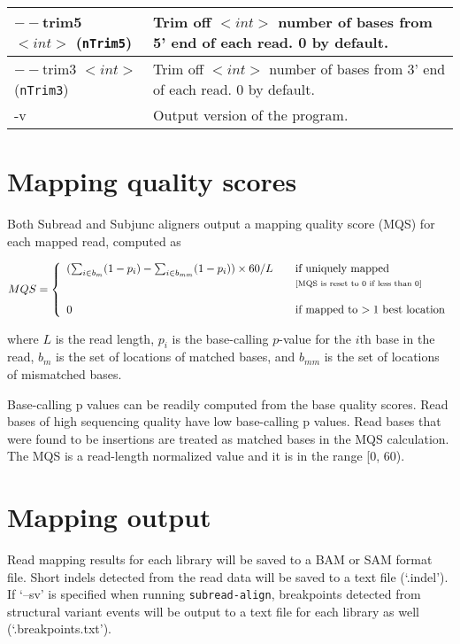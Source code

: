 \documentclass[12pt]{report}
\newcommand{\code}[1]{{\small\texttt{#1}}}
\newcommand{\Subread}{\textsf{Subread}}
\newcommand{\Subjunc}{\textsf{Subjunc}}
\begin{document}
\begin{longtable}{|p{4cm}|p{12cm}|}
\hline
$--$trim5 $<int>$ \newline (\code{nTrim5}) & Trim off $<int>$ number of bases from 5' end of each read. 0 by default.\\
\hline
$--$trim3 $<int>$ \newline (\code{nTrim3}) & Trim off $<int>$ number of bases from 3' end of each read. 0 by default.\\
\hline
-v & Output version of the program. \\
\hline
\end{longtable}

\newpage

\section{Mapping quality scores}

Both {\Subread} and {\Subjunc} aligners output a mapping quality score (MQS) for each mapped read,
computed as

\[ MQS = \left\{
\begin{array}{l l}
(\sum_{i \in b_m} ( 1 - p_i) - \sum_{i \in b_{mm}} (1 - p_i)) \times 60 / L & \quad \text{if uniquely mapped}\\
& \quad \text{\scriptsize{[MQS is reset to 0 if less than 0]}}\\
& \\
0 & \quad \text{if mapped to $>1$ best location}\\
\end{array} \right.\]

where $L$ is the read length, $p_i$ is the base-calling $p$-value for the $i$th base in the read, $b_m$ is the set of locations of matched bases, and $b_{mm}$ is the set of locations of mismatched bases.

Base-calling p values can be readily computed from the base quality scores.
Read bases of high sequencing quality have low base-calling p values.
Read bases that were found to be insertions are treated as matched bases in the MQS calculation.
The MQS is a read-length normalized value and it is in the range [0, 60).

\section{Mapping output}

Read mapping results for each library will be saved to a BAM or SAM format file.
Short indels detected from the read data will be saved to a text file (`.indel').
If `--sv' is specified when running \code{subread-align}, breakpoints detected from structural variant events will be output to a text file for each library as well (`.breakpoints.txt').
\end{document}

